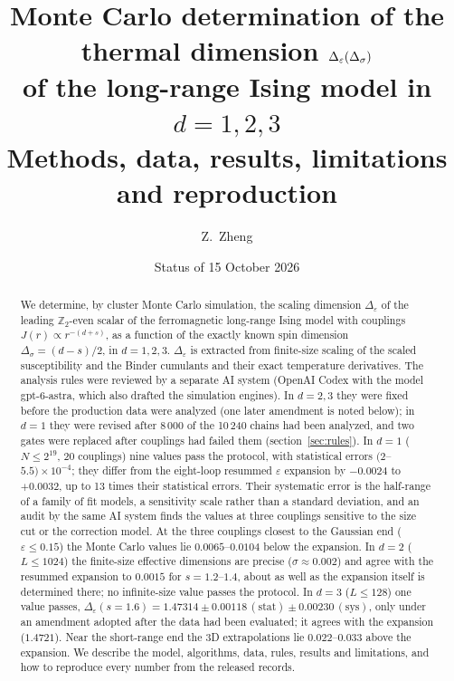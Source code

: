 \documentclass[10pt,a4paper]{article}
\title{Monte Carlo determination of the thermal dimension $\De(\Ds)$\\ of the long-range Ising model in $d=1,2,3$\\[4pt]
\large Methods, data, results, limitations and reproduction}
\author{Z.~Zheng}  %
\date{Status of 15 October 2026}
\newcommand{\Ds}{\Delta_\sigma}
\newcommand{\De}{\Delta_\varepsilon}
\begin{document}
\maketitle

\begin{abstract}\noindent
We determine, by cluster Monte Carlo simulation, the scaling dimension $\De$ of the leading $\mathbb Z_2$-even scalar of the ferromagnetic
long-range Ising model with couplings $J(r)\propto r^{-(d+s)}$, as a function of the exactly known spin dimension $\Ds=(d-s)/2$, in $d=1,2,3$.
$\De$ is extracted from finite-size scaling of the scaled susceptibility and the Binder cumulants and their exact temperature derivatives.
The analysis rules were reviewed by a separate AI system (OpenAI Codex with the model gpt-6-astra, which also drafted the simulation
engines). In $d=2,3$ they were fixed before the production data were analyzed (one later
amendment is noted below); in $d=1$ they were revised after 8\,000 of the 10\,240 chains had been analyzed, and two gates were replaced after
couplings had failed them (section~\ref{sec:rules}). In $d=1$ ($N\le2^{19}$, 20 couplings) nine values pass the protocol, with statistical errors
$(2$--$5.5)\times10^{-4}$; they differ from the eight-loop resummed $\varepsilon$ expansion by $-0.0024$ to $+0.0032$, up to 13 times their
statistical errors. Their systematic error is the half-range of a family of fit models, a sensitivity scale rather than a standard deviation,
and an audit by the same AI system finds the values at three couplings sensitive to the size cut or the correction model. At the three
couplings closest to the Gaussian end ($\varepsilon\le0.15$) the Monte Carlo values lie $0.0065$--$0.0104$ below the expansion. In $d=2$
($L\le1024$) the finite-size effective dimensions are precise ($\sigma\approx0.002$) and agree with the resummed expansion to $0.0015$ for
$s=1.2$--$1.4$, about as well as the expansion itself is determined there; no infinite-size value passes the protocol. In $d=3$ ($L\le128$) one
value passes, $\De(s{=}1.6)=1.47314\pm0.00118\,(\mathrm{stat})\pm0.00230\,(\mathrm{sys})$, only under an amendment adopted after the data had been
evaluated; it agrees with the expansion ($1.4721$). Near the short-range end the 3D extrapolations lie $0.022$--$0.033$ above the expansion.
We describe the model, algorithms, data, rules, results and limitations, and how to reproduce every number from the released records.
\end{abstract}

\tableofcontents
\clearpage
\end{document}
